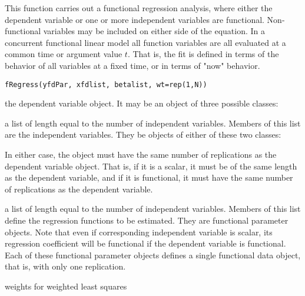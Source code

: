 \begin{Description}\relax
This function carries out a functional regression analysis,
where either the dependent variable or one or more
independent variables are functional.  Non-functional variables
may be included on either side of the equation.  In a concurrent
functional linear model all function variables are all evaluated at
a common time or argument value $t$.   That is, the fit is
defined in terms of the behavior of all variables at a fixed time,
or in terms of "now" behavior.
\end{Description}
\begin{Usage}
\begin{verbatim}
fRegress(yfdPar, xfdlist, betalist, wt=rep(1,N))
\end{verbatim}
\end{Usage}
\begin{Arguments}
\begin{ldescription}
\item[\code{yfdPar}] the dependent variable object.  It may be an object of
three possible classes:

\item[\code{xfdlist}] a list of length equal to the number of independent variables. Members
of this list are the independent variables.  They be objects of either
of these two classes:


In either case, the object must have the same number of replications as
the dependent variable object.  That is, if it is a scalar, it must be
of the same length as the dependent variable, and if it is functional,
it must have the same number of replications as the dependent variable.

\item[\code{betalist}] a list of length equal to the number of independent variables. Members
of this list define the regression functions to be estimated.
They are functional parameter objects.  Note that even if corresponding
independent variable is scalar, its regression coefficient will be
functional if the dependent variable is functional.  Each of these
functional parameter objects defines a single functional data object,
that is, with only one replication.

\item[\code{wt}] weights for weighted least squares 

\end{ldescription}
\end{Arguments}
